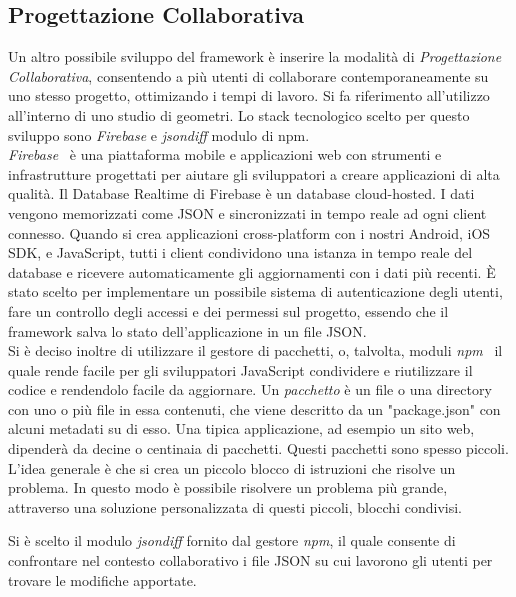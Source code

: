 \subsection{Progettazione Collaborativa}
\label{sec:conclusions_section_2_sub_2}
Un altro possibile sviluppo del framework è inserire la modalità di \emph{Progettazione Collaborativa}, consentendo a più utenti
di collaborare contemporaneamente su uno stesso progetto, ottimizando i tempi di lavoro. Si fa riferimento
all'utilizzo all'interno di uno studio di geometri. Lo stack tecnologico scelto per questo sviluppo sono
\emph{Firebase} e \emph{jsondiff} modulo di npm.\\
\emph{Firebase}~\cite{firebase} è una piattaforma mobile e applicazioni web con strumenti e infrastrutture progettati per aiutare gli sviluppatori
a creare applicazioni di alta qualità.
Il Database Realtime di Firebase  è un database cloud-hosted. I dati vengono memorizzati come JSON e
sincronizzati in tempo reale ad ogni client connesso. Quando si crea applicazioni cross-platform con
i nostri Android, iOS SDK, e JavaScript, tutti i client condividono una istanza in tempo reale del
database e ricevere automaticamente gli aggiornamenti con i dati più recenti.
\`E stato scelto per implementare un possibile sistema di autenticazione degli utenti, fare un controllo degli accessi e dei permessi
sul progetto, essendo che il framework salva lo stato dell'applicazione in un file JSON.\\
Si è deciso inoltre di utilizzare il gestore di pacchetti, o, talvolta, moduli \emph{npm}~\cite{npm} il quale rende facile per gli sviluppatori
JavaScript condividere e riutilizzare il codice e rendendolo facile da aggiornare.
Un \emph{pacchetto} è un file o una directory con uno o più file in essa contenuti, che viene descritto da un "package.json"
con alcuni metadati su di esso. Una tipica applicazione, ad esempio un sito web, dipenderà da decine o centinaia di pacchetti.
Questi pacchetti sono spesso piccoli. L'idea generale è che si crea un piccolo blocco di istruzioni che risolve un problema.
In questo modo è possibile risolvere un problema più grande, attraverso una soluzione personalizzata di questi piccoli,
blocchi condivisi.
\newpage

Si è scelto il modulo \emph{jsondiff} fornito dal gestore \emph{npm}, il quale consente di confrontare nel contesto collaborativo i file JSON su cui
lavorono gli utenti per trovare le modifiche apportate.\\

